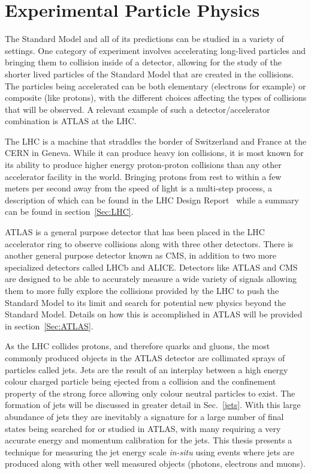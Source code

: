 \section{Experimental Particle Physics}
\label{Sec:Experi}
The Standard Model and all of its predictions can be studied in a variety of settings.  
One category of experiment involves accelerating long-lived particles and bringing them to collision inside of a detector, allowing for the study of the shorter lived particles of the Standard Model that are created in the collisions.  
The particles being accelerated can be both elementary (electrons for example) or composite (like protons), with the different choices affecting the types of collisions that will be observed.  
A relevant example of such a detector/accelerator combination is \gls{ATLAS} at the \gls{LHC}.  

The \gls{LHC} is a machine that straddles the border of Switzerland and France at the \gls{CERN} in Geneva.  
While it can produce heavy ion collisions, it is most known for its ability to produce higher energy proton-proton collisions than any other accelerator facility in the world.   
Bringing protons from rest to within a few meters per second away from the speed of light is a multi-step process, a description of which can be found in the LHC Design Report~\cite{LHCDesignReport} while a summary can be found in section~\ref{Sec:LHC}.  

\gls{ATLAS} is a general purpose detector that has been placed in the LHC accelerator ring to observe collisions along with three other detectors.  
There is another general purpose detector known as \gls{CMS}, in addition to two more specialized detectors called \gls{LHCb} and \gls{ALICE}.  
Detectors like \gls{ATLAS} and \gls{CMS} are designed to be able to accurately measure a wide variety of signals allowing them to more fully explore the collisions provided by the \gls{LHC} to push the Standard Model to its limit and search for potential new physics beyond the Standard Model.  
Details on how this is accomplished in ATLAS will be provided in section~\ref{Sec:ATLAS}.  

As the \gls{LHC} collides protons, and therefore quarks and gluons, the most commonly produced objects in the \gls{ATLAS} detector are collimated sprays of particles called jets.  
Jets are the result of an interplay between a high energy colour charged particle being ejected from a collision and the confinement property of the strong force allowing only colour neutral particles to exist.  
The formation of jets will be discussed in greater detail in Sec.~\ref{jets}.  
With this large abundance of jets they are inevitably a signature for a large number of final states being searched for or studied in ATLAS, with many requiring a very accurate energy and momentum calibration for the jets.  
This thesis presents a technique for measuring the jet energy scale \textit{in-situ} using events where jets are produced along with other well measured objects (photons, electrons and muons).  

